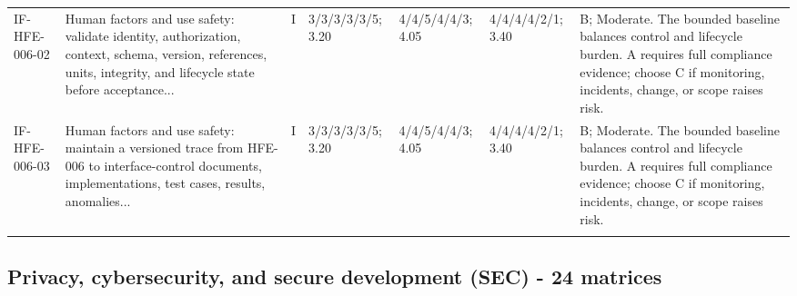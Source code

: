 \documentclass[11pt,letterpaper]{article}
\begin{document}
\begin{scriptsize}
\begin{longtable}{@{}L{0.11\textwidth}L{0.165\textwidth}L{0.04\textwidth}L{0.115\textwidth}L{0.115\textwidth}L{0.115\textwidth}L{0.235\textwidth}@{}}
\addlinespace[2pt]
IF-HFE-006-02 & Human factors and use safety: validate identity, authorization, context, schema, version, references, units, integrity, and lifecycle state before acceptance... & I & 3/3/3/3/3/5; 3.20 & 4/4/5/4/4/3; 4.05 & 4/4/4/4/2/1; 3.40 & B; Moderate. The bounded baseline balances control and lifecycle burden. A requires full compliance evidence; choose C if monitoring, incidents, change, or scope raises risk. \\
\addlinespace[2pt]
IF-HFE-006-03 & Human factors and use safety: maintain a versioned trace from HFE-006 to interface-control documents, implementations, test cases, results, anomalies... & I & 3/3/3/3/3/5; 3.20 & 4/4/5/4/4/3; 4.05 & 4/4/4/4/2/1; 3.40 & B; Moderate. The bounded baseline balances control and lifecycle burden. A requires full compliance evidence; choose C if monitoring, incidents, change, or scope raises risk. \\
\addlinespace[2pt]
\end{longtable}
\end{scriptsize}

\subsection{Privacy, cybersecurity, and secure development (SEC) - 24 matrices}
\end{document}
